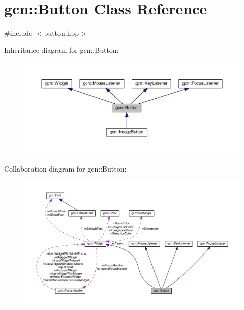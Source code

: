 \hypertarget{classgcn_1_1Button}{}\section{gcn\+:\+:Button Class Reference}
\label{classgcn_1_1Button}


{\ttfamily \#include $<$button.\+hpp$>$}



Inheritance diagram for gcn\+:\+:Button\+:\nopagebreak
\begin{figure}[H]
\begin{center}
\leavevmode
\includegraphics[width=350pt]{classgcn_1_1Button__inherit__graph}
\end{center}
\end{figure}


Collaboration diagram for gcn\+:\+:Button\+:\nopagebreak
\begin{figure}[H]
\begin{center}
\leavevmode
\includegraphics[width=350pt]{classgcn_1_1Button__coll__graph}
\end{center}
\end{figure}
